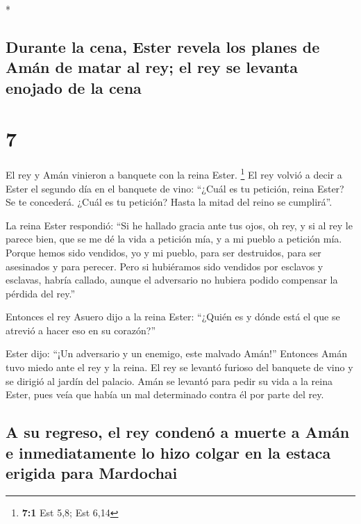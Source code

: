 \begin{paracol}{2}
\begin{otherlanguage}{english}
\end{otherlanguage}

\switchcolumn[0]*

\hypertarget{durante-la-cena-ester-revela-los-planes-de-amuxe1n-de-matar-al-rey-el-rey-se-levanta-enojado-de-la-cena}{%
\subsection{Durante la cena, Ester revela los planes de Amán de matar al
rey; el rey se levanta enojado de la
cena}\label{durante-la-cena-ester-revela-los-planes-de-amuxe1n-de-matar-al-rey-el-rey-se-levanta-enojado-de-la-cena}}

\hypertarget{section-12}{%
\section{7}\label{section-12}}

 El rey y Amán vinieron a banquete con la reina Ester.
\footnote{\textbf{7:1} Est 5,8; Est 6,14}  El rey volvió a
decir a Ester el segundo día en el banquete de vino: ``¿Cuál es tu
petición, reina Ester? Se te concederá. ¿Cuál es tu petición? Hasta la
mitad del reino se cumplirá''.

 La reina Ester respondió: ``Si he hallado gracia ante tus
ojos, oh rey, y si al rey le parece bien, que se me dé la vida a
petición mía, y a mi pueblo a petición mía.  Porque hemos
sido vendidos, yo y mi pueblo, para ser destruidos, para ser asesinados
y para perecer. Pero si hubiéramos sido vendidos por esclavos y
esclavas, habría callado, aunque el adversario no hubiera podido
compensar la pérdida del rey.''

 Entonces el rey Asuero dijo a la reina Ester: ``¿Quién es
y dónde está el que se atrevió a hacer eso en su corazón?''

 Ester dijo: ``¡Un adversario y un enemigo, este malvado
Amán!'' Entonces Amán tuvo miedo ante el rey y la reina. 
El rey se levantó furioso del banquete de vino y se dirigió al jardín
del palacio. Amán se levantó para pedir su vida a la reina Ester, pues
veía que había un mal determinado contra él por parte del rey.

\hypertarget{a-su-regreso-el-rey-condenuxf3-a-muerte-a-amuxe1n-e-inmediatamente-lo-hizo-colgar-en-la-estaca-erigida-para-mardochai}{%
\subsection{A su regreso, el rey condenó a muerte a Amán e
inmediatamente lo hizo colgar en la estaca erigida para
Mardochai}\label{a-su-regreso-el-rey-condenuxf3-a-muerte-a-amuxe1n-e-inmediatamente-lo-hizo-colgar-en-la-estaca-erigida-para-mardochai}}


\end{paracol}
